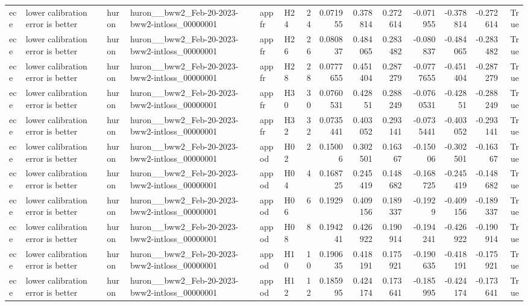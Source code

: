 \begin{longtable}{llllllrrrrrrrr}
ece & lower calibration error is better & huron & huron\_\_bww2\_Feb-20-2023-bww2-intloss\_00000001 & appfr & H24 & 24 & 0.071955 & 0.378814 & 0.272614 & -0.071955 & -0.378814 & -0.272614 & True \\
ece & lower calibration error is better & huron & huron\_\_bww2\_Feb-20-2023-bww2-intloss\_00000001 & appfr & H26 & 26 & 0.080837 & 0.484065 & 0.283482 & -0.080837 & -0.484065 & -0.283482 & True \\
ece & lower calibration error is better & huron & huron\_\_bww2\_Feb-20-2023-bww2-intloss\_00000001 & appfr & H28 & 28 & 0.0777655 & 0.451404 & 0.287279 & -0.0777655 & -0.451404 & -0.287279 & True \\
ece & lower calibration error is better & huron & huron\_\_bww2\_Feb-20-2023-bww2-intloss\_00000001 & appfr & H30 & 30 & 0.0760531 & 0.42851 & 0.288249 & -0.0760531 & -0.42851 & -0.288249 & True \\
ece & lower calibration error is better & huron & huron\_\_bww2\_Feb-20-2023-bww2-intloss\_00000001 & appfr & H32 & 32 & 0.0735441 & 0.403052 & 0.293141 & -0.0735441 & -0.403052 & -0.293141 & True \\
ece & lower calibration error is better & huron & huron\_\_bww2\_Feb-20-2023-bww2-intloss\_00000001 & appod & H02 & 2 & 0.15006 & 0.302501 & 0.16367 & -0.15006 & -0.302501 & -0.16367 & True \\
ece & lower calibration error is better & huron & huron\_\_bww2\_Feb-20-2023-bww2-intloss\_00000001 & appod & H04 & 4 & 0.168725 & 0.245419 & 0.148682 & -0.168725 & -0.245419 & -0.148682 & True \\
ece & lower calibration error is better & huron & huron\_\_bww2\_Feb-20-2023-bww2-intloss\_00000001 & appod & H06 & 6 & 0.1929 & 0.409156 & 0.189337 & -0.1929 & -0.409156 & -0.189337 & True \\
ece & lower calibration error is better & huron & huron\_\_bww2\_Feb-20-2023-bww2-intloss\_00000001 & appod & H08 & 8 & 0.194241 & 0.426922 & 0.190914 & -0.194241 & -0.426922 & -0.190914 & True \\
ece & lower calibration error is better & huron & huron\_\_bww2\_Feb-20-2023-bww2-intloss\_00000001 & appod & H10 & 10 & 0.190635 & 0.418191 & 0.175921 & -0.190635 & -0.418191 & -0.175921 & True \\
ece & lower calibration error is better & huron & huron\_\_bww2\_Feb-20-2023-bww2-intloss\_00000001 & appod & H12 & 12 & 0.185995 & 0.424174 & 0.173641 & -0.185995 & -0.424174 & -0.173641 & True \\

\end{longtable}
